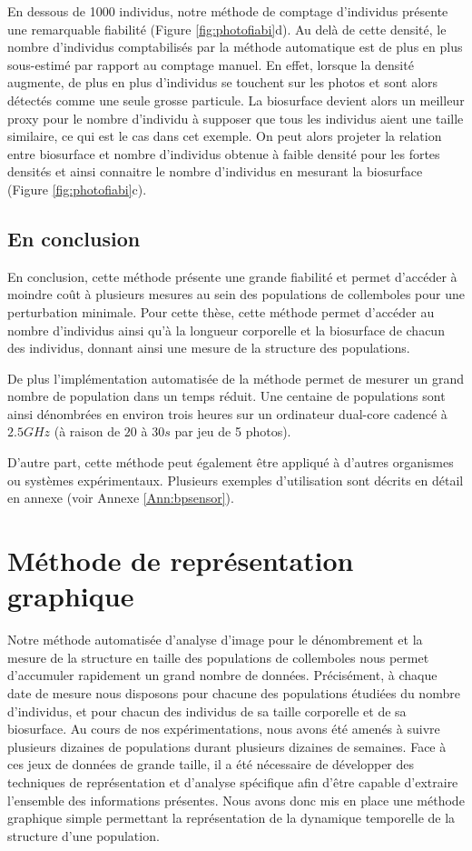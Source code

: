 En dessous de 1000 individus, notre méthode de comptage d'individus présente une
remarquable fiabilité (Figure \ref{fig:photofiabi}d). Au delà de cette densité,
le nombre d'individus comptabilisés par la méthode automatique est de plus en
plus sous-estimé par rapport au comptage manuel. En effet, lorsque la densité
augmente, de plus en plus d'individus se touchent sur les photos et sont alors
détectés comme une seule grosse particule. La biosurface devient alors un
meilleur proxy pour le nombre d'individu à supposer que tous les individus aient
une taille similaire, ce qui est le cas dans cet exemple. On peut alors projeter
la relation entre biosurface et nombre d'individus obtenue à faible densité pour
les fortes densités et ainsi connaitre le nombre d'individus en mesurant la
biosurface (Figure \ref{fig:photofiabi}c).

\subsection{En conclusion}

En conclusion, cette méthode présente une grande fiabilité et permet d'accéder à
moindre coût à plusieurs mesures au sein des populations de collemboles pour une
perturbation minimale. Pour cette thèse, cette méthode permet d'accéder au
nombre d'individus ainsi qu'à la longueur corporelle et la biosurface de chacun
des individus, donnant ainsi une mesure de la structure des populations. 

De plus l'implémentation automatisée de la méthode permet de mesurer un grand
nombre de population dans un temps réduit. Une centaine de populations sont
ainsi dénombrées en environ trois heures sur un ordinateur dual-core cadencé à
$2.5GHz$ (à raison de $20$ à $30s$ par jeu de 5 photos).

D'autre part, cette méthode peut également être appliqué à d'autres organismes
ou systèmes expérimentaux. Plusieurs exemples d'utilisation sont décrits en
détail en annexe (voir Annexe \ref{Ann:bpsensor}).

\section{Méthode de représentation graphique}\label{sec:stdiag}

Notre méthode automatisée d'analyse d'image pour le dénombrement et la mesure de
la structure en taille des populations de collemboles nous permet d'accumuler
rapidement un grand nombre de données. Précisément, à chaque date de mesure nous
disposons pour chacune des populations étudiées du nombre d'individus, et pour
chacun des individus de sa taille corporelle et de sa biosurface. Au cours
de nos expérimentations, nous avons été amenés à suivre plusieurs dizaines de
populations durant plusieurs dizaines de semaines. Face à ces jeux de données de
grande taille, il a été nécessaire de développer des techniques de
représentation et d'analyse spécifique afin d'être capable d'extraire l'ensemble
des informations présentes. Nous avons donc mis en place une méthode graphique
simple permettant la représentation de la dynamique temporelle de la structure
d'une population. 

